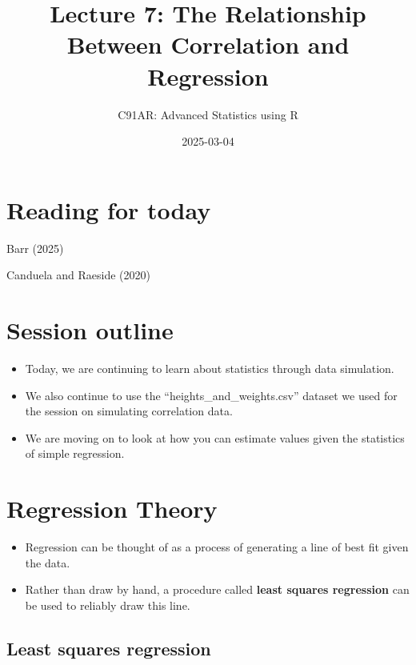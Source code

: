 \documentclass[
]{article}
\title{Lecture 7: The Relationship Between Correlation and Regression}
\subtitle{C91AR: Advanced Statistics using R}
\author{}
\date{\vspace{-2.5em}2025-03-04}
\providecommand{\tightlist}{%
  \setlength{\itemsep}{0pt}\setlength{\parskip}{0pt}}
\begin{document}
\maketitle

{
\setcounter{tocdepth}{2}
\tableofcontents
}
\hypertarget{reading-for-today}{%
\section{Reading for today}\label{reading-for-today}}

Barr (2025)

Canduela and Raeside (2020)

\hypertarget{session-outline}{%
\section{Session outline}\label{session-outline}}

\begin{itemize}
\tightlist
\item
  Today, we are continuing to learn about statistics through data
  simulation.
\item
  We also continue to use the ``heights\_and\_weights.csv'' dataset we
  used for the session on simulating correlation data.
\item
  We are moving on to look at how you can estimate values given the
  statistics of simple regression.
\end{itemize}

\hypertarget{regression-theory}{%
\section{Regression Theory}\label{regression-theory}}

\begin{itemize}
\tightlist
\item
  Regression can be thought of as a process of generating a line of best
  fit given the data.
\item
  Rather than draw by hand, a procedure called \textbf{least squares
  regression} can be used to reliably draw this line.
\end{itemize}

\hypertarget{least-squares-regression}{%
\subsection{Least squares regression}\label{least-squares-regression}}
\end{document}

